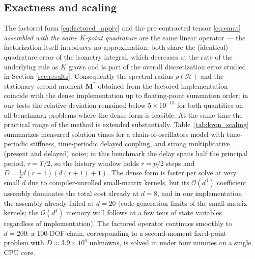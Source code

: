 \documentclass[preprint,12pt]{elsarticle}
\begin{document}
\subsection{Exactness and scaling}
The factored form \eqref{eq:factored_apply} and the pre-contracted tensor \eqref{eq:emat} \emph{assembled with the same $K$-point quadrature} are the same linear operator --- the factorization itself introduces no approximation; both share the (identical) quadrature error of the isometry integral, which decreases at the rate of the underlying rule as $K$ grows and is part of the overall discretization error studied in Section \ref{sec:results}. Consequently the spectral radius $\rho(\mathcal{H})$ and the stationary second moment $\mathbf{M}^*$ obtained from the factored implementation coincide with the dense implementation up to floating-point summation order; in our tests the relative deviation remained below $5\times 10^{-15}$ for both quantities on all benchmark problems where the dense form is feasible. At the same time the practical range of the method is extended substantially. Table~\ref{tab:kron_scaling} summarizes measured solution times for a chain-of-oscillators model with time-periodic stiffness, time-periodic delayed coupling, and strong multiplicative (present and delayed) noise; in this benchmark the delay spans half the principal period, $\tau = T/2$, so the history window holds $r = p/2$ steps and $D = \tfrac12 d(r{+}1)(d(r{+}1){+}1)$. The dense form is faster per solve at very small $d$ due to compiler-unrolled small-matrix kernels, but its $\mathcal{O}(d^4)$ coefficient assembly dominates the total cost already at $d = 8$, and in our implementation the assembly already failed at $d = 20$ (code-generation limits of the small-matrix kernels; the $\mathcal{O}(d^4)$ memory wall follows at a few tens of state variables regardless of implementation). The factored operator continues smoothly to $d = 200$: a $100$-DOF chain, corresponding to a second-moment fixed-point problem with $D \approx 3.9\times 10^6$ unknowns, is solved in under four minutes on a single CPU core.
\end{document}
